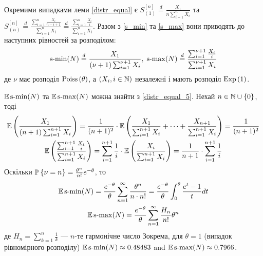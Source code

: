 Окремими випадками леми \ref{distr_equal}
є $S_{(1)}^{[n]} \overset{d}{=} \frac{X_1}{n\sum_{i=1}^n X_i}$
та $S_{(n)}^{[n]} \overset{d}{=} \frac{\sum_{i=1}^n \frac{X_i}{n-i+1}}{\sum_{i=1}^n X_i}
\overset{d}{=} \frac{\sum_{i=1}^n \frac{X_i}{i}}{\sum_{i=1}^n X_i}$.
Разом з \eqref{s_min} та \eqref{s_max}
вони приводять до наступних рівностей за розподілом:
\begin{gather}\label{distr_equal_5}
    \smin(N) \overset{d}{=}
    \frac{X_1}{(\nu+1)\sum_{i=1}^{\nu+1} X_i} , \;
    \smax(N) \overset{d}{=} 
    \frac{\sum_{i=1}^{\nu+1} \frac{X_i}{i}}{\sum_{i=1}^{\nu+1} X_i}
\end{gather}
де $\nu$ має розподіл $\Poiss{\theta}$, а $\left(X_i, i\in\N\right)$ незалежні і мають розподіл $\Exp{1}$.

$\E\smin(N)$ та $\E\smax(N)$ можна знайти з \eqref{distr_equal_5}. 
Нехай $n\in\N \cup \{0\}$, тоді
\begin{gather*}
    \E\left(
        \frac{X_1}{(n+1)\sum_{i=1}^{n+1} X_i}
    \right) = \frac{1}{(n+1)^2}\cdot \E \left(
        \frac{X_1}{\sum_{i=1}^{n+1} X_i} + \dots + \frac{X_{n+1}}{\sum_{i=1}^{n+1} X_i}
    \right) = \frac{1}{(n+1)^2} \\
    \E\left(
        \frac{\sum_{i=1}^{n+1} \frac{X_i}{i}}{\sum_{i=1}^{n+1} X_i}
    \right) = 
    \sum_{i=1}^{n+1} \frac{1}{i} \cdot \E\left(\frac{X_i}{\sum_{i=1}^{n+1} X_i}\right) = 
    \frac{1}{n+1} \cdot \sum_{i=1}^{n+1} \frac{1}{i}
\end{gather*}
Оскільки $\P{\nu = n} = \frac{\theta^n}{n!}e^{-\theta}$, то
\begin{gather*}
    \E\smin(N) = \frac{e^{-\theta}}{\theta}\sum_{n=1}^{\infty} \frac{\theta^n}{n\cdot n!} = \frac{e^{-\theta}}{\theta}\int_0^\theta \frac{e^t-1}{t}dt \\
    \E\smax(N) = \frac{e^{-\theta}}{\theta}\sum_{n=1}^{\infty} \frac{H_n}{n!} \theta^n
\end{gather*}
де $H_n = \sum_{k=1}^n \frac{1}{k}$ --- $n$-те гармонічне число
Зокрема, для $\theta = 1$ (випадок рівномірного розподілу) 
$\E\smin(N) \approx 0.48483$ and $\E\smax(N) \approx 0.7966$.